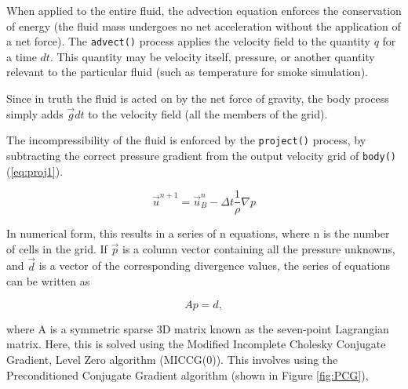 \documentclass[12pt]{article}
\begin{document}
When applied to the entire fluid, the advection equation enforces the conservation of energy (the fluid mass undergoes no net acceleration without the application of a net force). The \texttt{advect()} process applies the velocity field to the quantity $q$ for a time $dt$. This quantity may be velocity itself, pressure, or another quantity relevant to the particular fluid (such as temperature for smoke simulation).

Since in truth the fluid is acted on by the net force of gravity, the body process simply adds $\vec{g}dt$ to the velocity field (all the members of the grid).

The incompressibility of the fluid is enforced by the \texttt{project()} process, by subtracting the correct pressure gradient from the output velocity grid of \texttt{body()} (\ref{eq:proj1}).

\begin{equation}
\vec{u}^{n+1}=\vec{u}_B^n-\Delta t\frac{1}{\rho}\nabla p
\label{eq:proj1}
\end{equation}

In numerical form, this results in a series of n equations, where n is the number of cells in the grid. If $\vec{p}$ is a column vector containing all the pressure unknowns, and $\vec{d}$ is a vector of the corresponding divergence values, the series of equations can be written as

\begin{equation}
Ap=d,
\label{eq:apd}
\end{equation}

where A is a symmetric sparse 3D matrix known as the seven-point Lagrangian matrix. Here, this is solved using the Modified Incomplete Cholesky Conjugate Gradient, Level Zero algorithm (MICCG(0)). This involves using the Preconditioned Conjugate Gradient algorithm (shown in Figure \ref{fig:PCG}),
\end{document}
